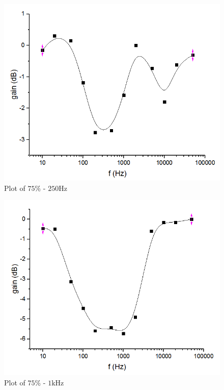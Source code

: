 \begin{figure}
	\centering
	\begin{framed}
		\includegraphics[width=\linewidth]{images/20.PNG}
		\caption{Plot of $75\%$ - $250\si{\hertz}$}
		\label{fig:plot20}
	\end{framed}
\end{figure}

\begin{figure}
	\centering
	\begin{framed}
		\includegraphics[width=\linewidth]{images/21.PNG}
		\caption{Plot of $75\%$ - $1\si{\kilo\hertz}$}
		\label{fig:plot21}
	\end{framed}
\end{figure}

